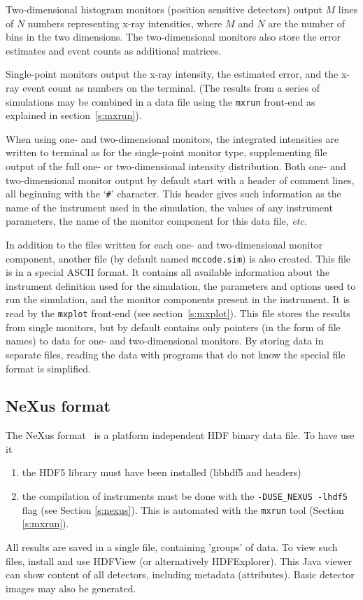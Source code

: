 Two-dimensional histogram monitors (position sensitive detectors) output $M$
lines of $N$ numbers representing x-ray intensities, where $M$ and $N$ are the
number of bins in the two dimensions. The two-dimensional monitors also store
the error estimates and event counts as additional matrices.

Single-point monitors output the x-ray intensity, the estimated
error, and the x-ray event count as numbers on the
terminal. (The results from a series of simulations may be combined in a
data file using the \verb+mxrun+ front-end as explained in
section~\ref{s:mxrun}).

When using one- and two-dimensional monitors, the integrated intensities are
written to terminal as for the single-point monitor type, supplementing file
output of the full one- or two-dimensional intensity distribution. Both one- and
two-dimensional monitor output by default start with a header of comment lines,
all beginning with the `\verb+#+' character.  This header gives such information
as the name of the instrument used in the simulation, the values of any
instrument parameters, the name of the monitor component for this data file,
\textit{etc}.

In addition to the files written for each one- and two-dimensional monitor
component, another file (by default named \verb+mccode.sim+) is also
created. This file is in a special \MCX ASCII format. It contains all available
information about the instrument definition used for the simulation, the
parameters and options used to run the simulation, and the monitor components
present in the instrument. It is read by the \verb+mxplot+ front-end (see
section~\ref{s:mxplot}). This file stores the results from single monitors, but
by default contains only pointers (in the form of file names) to data for one-
and two-dimensional monitors. By storing data in separate files, reading the
data with programs that do not know the special \MCX file format is
simplified.

\subsection{NeXus format}
\label{r:nexus}

The NeXus format~\cite{nexus_webpage} is a platform independent HDF binary data
file. To have \MCX use it
\begin{enumerate}
\item the HDF5 library must have been installed (libhdf5 and headers)
\item the compilation of instruments must be done with the
  \verb+-DUSE_NEXUS -lhdf5+ flag (see Section \ref{s:nexus}). This is
  automated with the \verb+mxrun+ tool (Section \ref{s:mxrun}).
\end{enumerate}
All results are saved in a single file, containing 'groups' of data. To view
such files, install and use HDFView (or alternatively HDFExplorer). This Java
viewer can show content of all detectors, including metadata (attributes). Basic
detector images may also be generated.

